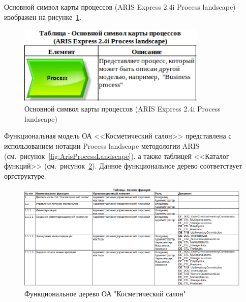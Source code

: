 Основной символ карты процессов (ARIS Express 2.4i \cite{ArisExpress} Process landscape)
изображен на рисунке~\ref{fig:ProcessLandscapeElement}.

\begin{figure}[!h]
    \centering

    \includegraphics[width=9cm]
    {assets/ARIS/ProcessLandscape/Element/ProcessLandscapeElement.png}

    \caption{Основной символ карты процессов (ARIS Express 2.4i Process landscape)}

    \label{fig:ProcessLandscapeElement}
\end{figure}

Функциональная модель ОА <<Косметический салон>> представлена
с использованием нотации Process landscape методологии ARIS
(см.~рисунок~\ref{fig:ArisProcessLandscape}),
а также таблицей <<Каталог функций>>
(см.~рисунок~\ref{fig:ProcessLandscapeCatalog}).
Данное функциональное дерево соответствует оргструктуре.



\begin{figure}[!h]
    \centering

    \includegraphics[width=16cm]
    {assets/ARIS/ProcessLandscape/Catalog/ProcessLandscapeCatalog.png}

    \caption{Функциональное дерево ОА "Косметический салон"}

    \label{fig:ProcessLandscapeCatalog}
\end{figure}

